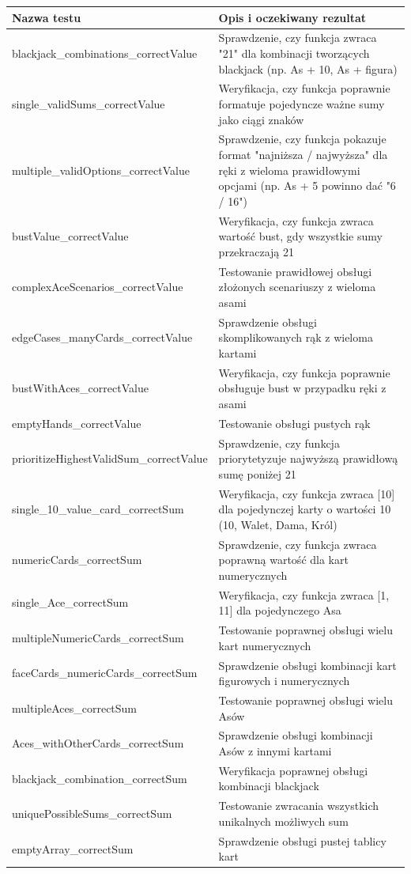 \documentclass[a4paper,12pt]{article}
\begin{document}
\begin{tabularx}{\textwidth}{lX}
\toprule
\textbf{Nazwa testu} & \textbf{Opis i oczekiwany rezultat} \\
\midrule
blackjack\_combinations\_correctValue & Sprawdzenie, czy funkcja zwraca "21" dla kombinacji tworzących blackjack (np. As + 10, As + figura) \\
single\_validSums\_correctValue & Weryfikacja, czy funkcja poprawnie formatuje pojedyncze ważne sumy jako ciągi znaków \\
multiple\_validOptions\_correctValue & Sprawdzenie, czy funkcja pokazuje format "najniższa / najwyższa" dla ręki z wieloma prawidłowymi opcjami (np. As + 5 powinno dać "6 / 16") \\
bustValue\_correctValue & Weryfikacja, czy funkcja zwraca wartość bust, gdy wszystkie sumy przekraczają 21 \\
complexAceScenarios\_correctValue & Testowanie prawidłowej obsługi złożonych scenariuszy z wieloma asami \\
edgeCases\_manyCards\_correctValue & Sprawdzenie obsługi skomplikowanych rąk z wieloma kartami \\
bustWithAces\_correctValue & Weryfikacja, czy funkcja poprawnie obsługuje bust w przypadku ręki z asami \\
emptyHands\_correctValue & Testowanie obsługi pustych rąk \\
prioritizeHighestValidSum\_correctValue & Sprawdzenie, czy funkcja priorytetyzuje najwyższą prawidłową sumę poniżej 21 \\
single\_10\_value\_card\_correctSum & Weryfikacja, czy funkcja zwraca [10] dla pojedynczej karty o wartości 10 (10, Walet, Dama, Król) \\
numericCards\_correctSum & Sprawdzenie, czy funkcja zwraca poprawną wartość dla kart numerycznych \\
single\_Ace\_correctSum & Weryfikacja, czy funkcja zwraca [1, 11] dla pojedynczego Asa \\
multipleNumericCards\_correctSum & Testowanie poprawnej obsługi wielu kart numerycznych \\
faceCards\_numericCards\_correctSum & Sprawdzenie obsługi kombinacji kart figurowych i numerycznych \\
multipleAces\_correctSum & Testowanie poprawnej obsługi wielu Asów \\
Aces\_withOtherCards\_correctSum & Sprawdzenie obsługi kombinacji Asów z innymi kartami \\
blackjack\_combination\_correctSum & Weryfikacja poprawnej obsługi kombinacji blackjack \\
uniquePossibleSums\_correctSum & Testowanie zwracania wszystkich unikalnych możliwych sum \\
emptyArray\_correctSum & Sprawdzenie obsługi pustej tablicy kart \\
\bottomrule
\end{tabularx}
\end{document}
